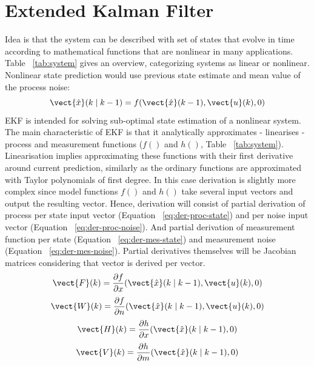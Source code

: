 \section{Extended Kalman Filter} \label{sec:ekf}
Idea is that the system can be described with set of states that evolve in time according to mathematical functions that are nonlinear in many applications. Table ~\ref{tab:system} gives an overview, categorizing systems as linear or nonlinear. Nonlinear state prediction would use previous state estimate and mean value of the process noise:
\begin{equation}
\vect{\hat{x}}(k \mid k-1) = f(\vect{\hat{x}}(k-1), \vect{u}(k), 0)
\label{eq:state-pred-nonlin}
\end{equation} 
EKF is intended for solving sub-optimal state estimation of a nonlinear system. The main characteristic of EKF is that it analytically approximates - linearises - process and measurement functions ($f()$ and $h()$, Table ~\ref{tab:system}). Linearisation implies approximating these functions with their first derivative around current prediction, similarly as the ordinary functions are approximated with Taylor polynomials of first degree. In this case derivation is slightly more complex since model functions $f()$ and $h()$ take several input vectors and output the resulting vector. Hence, derivation will consist of partial derivation of process per state input vector (Equation ~\ref{eq:der-proc-state}) and per noise input vector (Equation ~\ref{eq:der-proc-noise}). And partial derivation of measurement function per state (Equation ~\ref{eq:der-mes-state}) and measurement noise (Equation ~\ref{eq:der-mes-noise}). Partial derivatives themselves will be Jacobian matrices considering that vector is derived per vector. 
\begin{equation}
\vect{F}(k) = \frac{\partial f}{\partial x} (\vect{\hat{x}}(k \mid k-1), \vect{u}(k), 0)
\label{eq:der-proc-state}
\end{equation} 
\begin{equation}
\vect{W}(k) = \frac{\partial f}{\partial n} (\vect{\hat{x}}(k \mid k-1), \vect{u}(k), 0)
\label{eq:der-proc-noise}
\end{equation}
\begin{equation}
\vect{H}(k) = \frac{\partial h}{\partial x} (\vect{\hat{x}}(k \mid k-1), 0)
\label{eq:der-mes-state}
\end{equation} 
\begin{equation}
\vect{V}(k) = \frac{\partial h}{\partial m} (\vect{\hat{x}}(k \mid k-1), 0)
\label{eq:der-mes-noise}
\end{equation}
